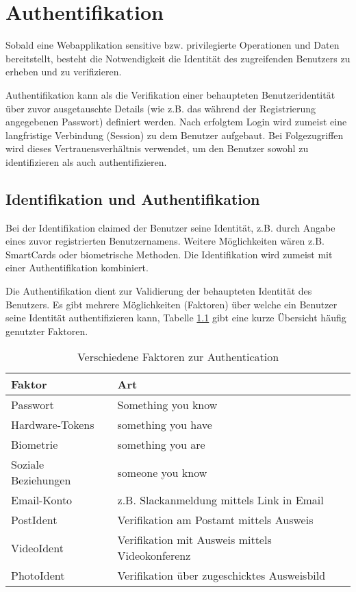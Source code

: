 \chapter{Authentifikation}

Sobald eine Webapplikation sensitive bzw. privilegierte Operationen und Daten bereitstellt, besteht die Notwendigkeit die Identität des zugreifenden Benutzers zu erheben und zu verifizieren.

Authentifikation kann als die Verifikation einer behaupteten Benutzeridentität über zuvor ausgetauschte Details (wie z.B. das während der Registrierung angegebenen Passwort) definiert werden. Nach erfolgtem Login wird zumeist eine langfristige Verbindung (Session) zu dem Benutzer aufgebaut. Bei Folgezugriffen wird dieses Vertrauensverhältnis verwendet, um den Benutzer sowohl zu identifizieren als auch authentifizieren.

\section{Identifikation und Authentifikation}

Bei der Identifikation claimed der Benutzer seine Identität, z.B. durch Angabe eines zuvor registrierten Benutzernamens. Weitere Möglichkeiten wären z.B. SmartCards oder biometrische Methoden. Die Identifikation wird zumeist mit einer Authentifikation kombiniert.

Die Authentifikation dient zur Validierung der behaupteten Identität des Benutzers. Es gibt mehrere Möglichkeiten (Faktoren) über welche ein Benutzer seine Identität authentifizieren kann, Tabelle \ref{tbl:factors} gibt eine kurze Übersicht häufig genutzter Faktoren.

\begin{table}[h!]
	\begin{center}
\begin{tabular}{lp{7cm}}
	\toprule
	Faktor & Art\\
	\midrule
	Passwort & Something you know \\
	Hardware-Tokens & something you have \\
	Biometrie & something you are \\
	Soziale Beziehungen & someone you know \\
	Email-Konto & z.B. Slackanmeldung mittels Link in Email \\
	PostIdent & Verifikation am Postamt mittels Ausweis \\
	VideoIdent & Verifikation mit Ausweis mittels Videokonferenz \\
	PhotoIdent & Verifikation über zugeschicktes Ausweisbild \\
	\bottomrule
\end{tabular}
	\caption{Verschiedene Faktoren zur Authentication}
	\label{tbl:factors}
\end{center}
\end{table}

